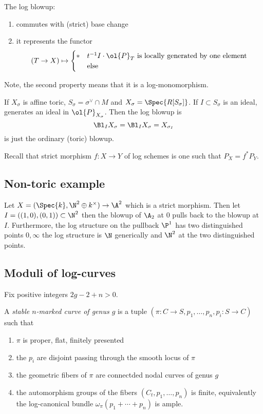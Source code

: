 \documentclass[12pt]{article}
\theoremstyle{plain}
\begin{document}
\begin{prop}
The log blowup:
\begin{enumerate}
\item commutes with (strict) base change 
\item it represents the functor 
\[ (T \to X) \mapsto 
\begin{cases}
* & t^{-1} I \cdot \ol{P}_T \text{ is locally generated by one element}
\\
\empty & \text{else}
\end{cases} \]
\end{enumerate}
Note, the second property means that it is a log-monomorphism. 
\end{prop}

If $X_\sigma$ is affine toric, $S_\sigma = \sigma^\vee \cap M$ and $X_\sigma = \Spec{R[S_\sigma]}$. If $I \subset S_\sigma$ is an ideal, generates an ideal in $\ol{P}_{X_\sigma}$. Then the log blowup is
\[ \Bl_I X_{\sigma} = \Bl_I X_\sigma = X_{\sigma_I} \]
is just the ordinary (toric) blowup.  

Recall that strict morphism $f : X \to Y$ of log schemes is one such that $P_X = f^* P_Y$.

\subsection{Non-toric example}

Let $X = (\Spec{k}, \N^2 \oplus k^\times) \to \A^2$ which is a strict morphism. Then let $I = ((1,0), (0,1)) \subset \N^2$ then the blowup of $\A_2$ at $0$ pulls back to the blowup at $I$. Furthermore, the log structure on the pullback $\P^1$ has two distinguished points $0,\infty$ the log structure is $\N$ generically and $\N^2$ at the two distinguished points.

\subsection{Moduli of log-curves}

Fix positive integers $2g - 2 + n > 0$. 

\begin{defn}
A \textit{stable $n$-marked curve of genus $g$} is a tuple $(\pi : C \to S, p_1, \dots, p_n, p_i : S \to C)$ such that
\begin{enumerate}
\item $\pi$ is proper, flat, finitely presented
\item the $p_i$ are disjoint passing through the smooth locus of $\pi$
\item the geometric fibers of $\pi$ are connectded nodal curves of genus $g$
\item the automorphism groups of the fibers $(C_t, p_1, \dots, p_n)$ is finite, equivalently the log-canonical bundle $\omega_{\pi}(p_1 + \cdots + p_n)$ is ample.
\end{enumerate}
\end{defn} 
\end{document}
